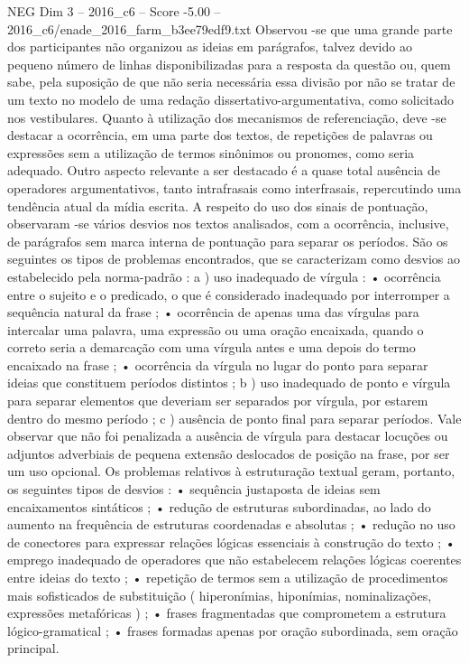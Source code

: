 \begin{textsample}{NEG Dim 3 – 2016\_c6 – Score -5.00 – 2016\_c6/enade\_2016\_farm\_b3ee79edf9.txt}
Observou -se que uma grande parte dos participantes não organizou as ideias em parágrafos, talvez devido ao pequeno número de linhas disponibilizadas para a resposta da questão ou, quem sabe, pela suposição de que não seria necessária essa divisão por não se tratar de um texto no modelo de uma redação dissertativo-argumentativa, como solicitado nos vestibulares.
Quanto à utilização dos mecanismos de referenciação, deve -se destacar a ocorrência, em uma parte dos textos, de repetições de palavras ou expressões sem a utilização de termos sinônimos ou pronomes, como seria adequado.
Outro aspecto relevante a ser destacado é a quase total ausência de operadores argumentativos, tanto intrafrasais como interfrasais, repercutindo uma tendência atual da mídia escrita.
A respeito do uso dos sinais de pontuação, observaram -se vários desvios nos textos analisados, com a ocorrência, inclusive, de parágrafos sem marca interna de pontuação para separar os períodos.
São os seguintes os tipos de problemas encontrados, que se caracterizam como desvios ao estabelecido pela norma-padrão : a ) uso inadequado de vírgula : • ocorrência entre o sujeito e o predicado, o que é considerado inadequado por interromper a sequência natural da frase ; • ocorrência de apenas uma das vírgulas para intercalar uma palavra, uma expressão ou uma oração encaixada, quando o correto seria a demarcação com uma vírgula antes e uma depois do termo encaixado na frase ; • ocorrência da vírgula no lugar do ponto para separar ideias que constituem períodos distintos ; b ) uso inadequado de ponto e vírgula para separar elementos que deveriam ser separados por vírgula, por estarem dentro do mesmo período ; c ) ausência de ponto final para separar períodos.
Vale observar que não foi penalizada a ausência de vírgula para destacar locuções ou adjuntos adverbiais de pequena extensão deslocados de posição na frase, por ser um uso opcional.
Os problemas relativos à estruturação textual geram, portanto, os seguintes tipos de desvios : • sequência justaposta de ideias sem encaixamentos sintáticos ; • redução de estruturas subordinadas, ao lado do aumento na frequência de estruturas coordenadas e absolutas ; • redução no uso de conectores para expressar relações lógicas essenciais à construção do texto ; • emprego inadequado de operadores que não estabelecem relações lógicas coerentes entre ideias do texto ; • repetição de termos sem a utilização de procedimentos mais sofisticados de substituição ( hiperonímias, hiponímias, nominalizações, expressões metafóricas ) ; • frases fragmentadas que comprometem a estrutura lógico-gramatical ; • frases formadas apenas por oração subordinada, sem oração principal.

\end{textsample}
